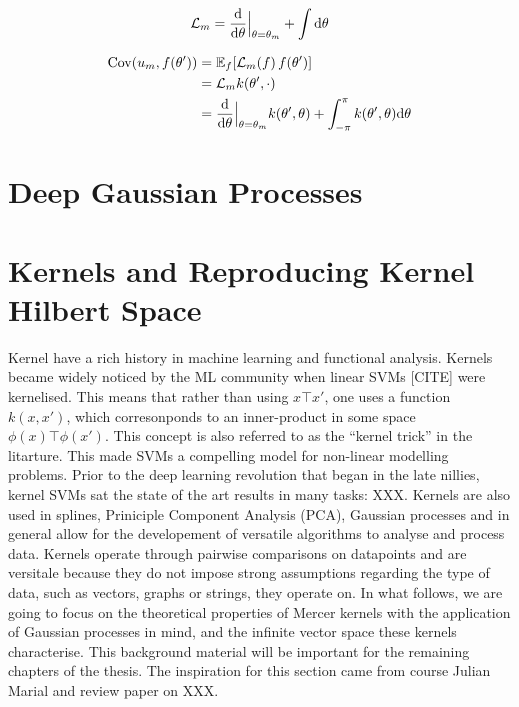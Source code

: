 \begin{equation}
  \mathcal{L}_m = \frac{\mathrm{d}{}}{\mathrm{d}{\theta}}\Bigr|_{\theta = \theta_m} + \int \mathrm{d}{\theta}
\end{equation}

\begin{align}
  \Cov(u_m, f(\theta')) &= \Exp{f}{\mathcal{L}_m(f)\,f(\theta')} \\
                      &=  \mathcal{L}_m k(\theta', \cdot) \\
                      &= \frac{\calcd{}}{\calcd{\theta}}\Bigr|_{\theta = \theta_m} k(\theta', \theta) + \int_{-\pi}^\pi k(\theta', \theta) \calcd{\theta}
\end{align}



\section{Deep Gaussian Processes}



\section{Kernels and Reproducing Kernel Hilbert Space}

Kernel have a rich history in machine learning and functional analysis. Kernels became widely noticed  by the ML community when linear SVMs [CITE] were kernelised. This means that rather than using $x\top x'$, one uses a function $k(x, x')$, which corresonponds to an inner-product in some space $\phi(x)\top \phi(x')$. This concept is also referred to as the ``kernel trick'' in the litarture. This made SVMs a compelling model for non-linear modelling problems. Prior to the deep learning revolution that began in the late nillies, kernel SVMs sat the state of the art results in many tasks: XXX. Kernels are also used in splines, Priniciple Component Analysis (PCA), Gaussian processes and in general allow for the developement of versatile algorithms to analyse and process data. Kernels operate through pairwise comparisons on datapoints and are versitale because they do not impose strong assumptions regarding the type of data, such as vectors, graphs or strings, they operate on. In what follows, we are going to focus on the theoretical properties of Mercer kernels with the application of Gaussian processes in mind, and the infinite vector space these kernels characterise. This background material will be important for the remaining chapters of the thesis. The inspiration for this section came from course Julian Marial and review paper on XXX.

